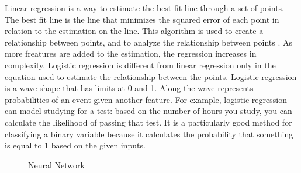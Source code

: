 \documentclass[midd]{thesis}
\begin{document}
Linear regression is a way to estimate the best fit line through a set of points. The best fit line is the line that minimizes the squared error of each point in relation to the estimation on the line. This algorithm is used to create a relationship between points, and to analyze the relationship between points \cite{Swaminathan}. As more freatures are added to the estimation, the regression increases in complexity. Logistic regression is different from linear regression only in the equation used to estimate the relationship between the points. Logistic regression is a wave shape that has limits at 0 and 1. Along the wave represents probabilities of an event given another feature. For example, logistic regression can model studying for a test: based on the number of hours you study, you can calculate the likelihood of passing that test. It is a particularly good method for classifying a binary variable because it calculates the probability that something is equal to 1 based on the given inputs.



\begin{figure}
\caption{Neural Network}
\label{fig:nn}
\end{figure}
\end{document}
